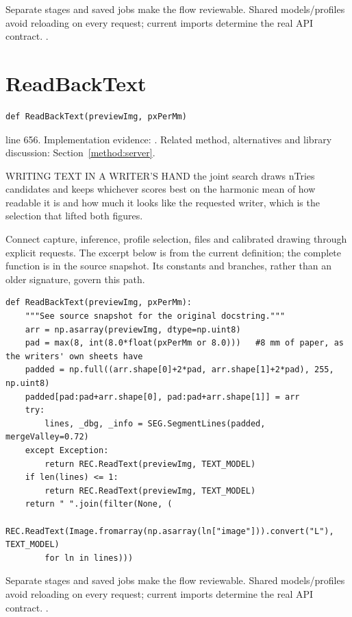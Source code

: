 Separate stages and saved jobs make the flow reviewable. Shared models/profiles avoid reloading on every request; current imports determine the real API contract. \cite{flaskdocs,pillowops,code2026}.


\section{ReadBackText}\label{fn:web-server:ReadBackText}
\begin{lstlisting}[style=sig]
def ReadBackText(previewImg, pxPerMm)
\end{lstlisting}
 line 656. Implementation evidence: \cite{code2026}. Related method, alternatives and library discussion: Section~\ref{method:server}.


WRITING TEXT IN A WRITER'S HAND the joint search draws nTries candidates and keeps whichever scores best on the harmonic mean of how readable it is and how much it looks like the requested writer, which is the selection that lifted both figures.


Connect capture, inference, profile selection, files and calibrated drawing through explicit requests. The excerpt below is from the current definition; the complete function is in the source snapshot. Its constants and branches, rather than an older signature, govern this path.


\begin{lstlisting}[style=plain]
def ReadBackText(previewImg, pxPerMm):
    """See source snapshot for the original docstring."""
    arr = np.asarray(previewImg, dtype=np.uint8)
    pad = max(8, int(8.0*float(pxPerMm or 8.0)))   #8 mm of paper, as the writers' own sheets have
    padded = np.full((arr.shape[0]+2*pad, arr.shape[1]+2*pad), 255, np.uint8)
    padded[pad:pad+arr.shape[0], pad:pad+arr.shape[1]] = arr
    try:
        lines, _dbg, _info = SEG.SegmentLines(padded, mergeValley=0.72)
    except Exception:
        return REC.ReadText(previewImg, TEXT_MODEL)
    if len(lines) <= 1:
        return REC.ReadText(previewImg, TEXT_MODEL)
    return " ".join(filter(None, (
        REC.ReadText(Image.fromarray(np.asarray(ln["image"])).convert("L"), TEXT_MODEL)
        for ln in lines)))
\end{lstlisting}
Separate stages and saved jobs make the flow reviewable. Shared models/profiles avoid reloading on every request; current imports determine the real API contract. \cite{flaskdocs,pillowops,code2026}.


